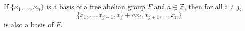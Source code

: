 If $\{x_1, \ldots, x_n\}$ is a basis of a free abelian group $F$ and $a \in \mathbb{Z}$, then for all $i \neq j$,
$$\{x_1, \ldots, x_{j-1}, x_j + ax_i, x_{j+1}, \ldots, x_n\}$$
is also a basis of $F$.
